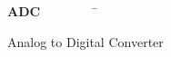 \vspace{0.5cm}

\item 
\begin{tabbing}

\hspace{-0.27cm}
\textbf{ADC}~~~~~~~~~\=\parbox{13.2cm}{Analog to Digital Converter \dotfill \pageref{symbol:ADC}}\\


\end{tabbing}
